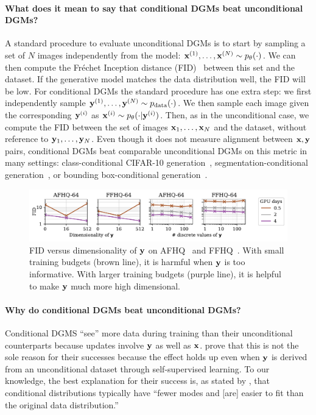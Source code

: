 \paragraph{What does it mean to say that conditional DGMs beat unconditional DGMs?} A standard procedure to evaluate unconditional DGMs is to start by sampling a set of $N$ images independently from the model: ${{\mathbf{x}}^{(1)},\ldots,{\mathbf{x}}^{(N)} \sim p_\theta(\cdot)}$. We can then compute the Fr\'echet Inception distance (FID)~\citep{heusel2017gans} between this set and the dataset. If the generative model matches the data distribution well, the FID will be low.
%
For conditional DGMs the standard procedure has one extra step: we first independently sample ${{\mathbf{y}}^{(1)},\ldots,{\mathbf{y}}^{(N)} \sim p_{\rm{data}}(\cdot)}$. We then sample each image given the corresponding ${\mathbf{y}}^{(i)}$ as ${{\mathbf{x}}^{(i)} \sim p_\theta(\cdot|{\mathbf{y}}^{(i)})}$. 
%
Then, as in the unconditional case, we compute the FID between the set of images ${\mathbf{x}}_1,\ldots,{\mathbf{x}}_N$ and the dataset, without reference to ${\mathbf{y}}_1,\ldots,{\mathbf{y}}_N$. Even though it does not measure alignment between ${\mathbf{x}}, {\mathbf{y}}$ pairs, conditional DGMs beat comparable unconditional DGMs on this metric in many settings: class-conditional CIFAR-10 generation~\citep{karras2022elucidating}, segmentation-conditional generation~\citep{hu2022self}, or bounding box-conditional generation~\citep{hu2022self}.

\begin{figure}[t]
    \centering
    \includegraphics[width=\textwidth]{figs/2sdm/cond-results-vs-nclusters.pdf}
    \caption{FID versus dimensionality of ${\mathbf{y}}$ on AFHQ~\citep{choi2020stargan} and FFHQ~\citep{karras2018style}. With small training budgets (brown line), it is harmful when ${\mathbf{y}}$ is too informative. With larger training budgets (purple line), it is helpful to make ${\mathbf{y}}$ much more high dimensional.}
    \label{fig:fid-vs-ncomp}
\end{figure}

\paragraph{Why do conditional DGMs beat unconditional DGMs?}

Conditional DGMS ``see'' more data during training than their unconditional counterparts because updates involve ${\mathbf{y}}$ as well as ${\mathbf{x}}$. \citet{bao2022conditional,hu2022self} prove that this is not the sole reason for their successes because the effect holds up even when ${\mathbf{y}}$ is derived from an unconditional dataset through self-supervised learning.
%
To our knowledge, the best explanation for their success is, as stated by \citet{bao2022conditional}, that conditional distributions typically have ``fewer modes and [are] easier to fit than the original data distribution.''

